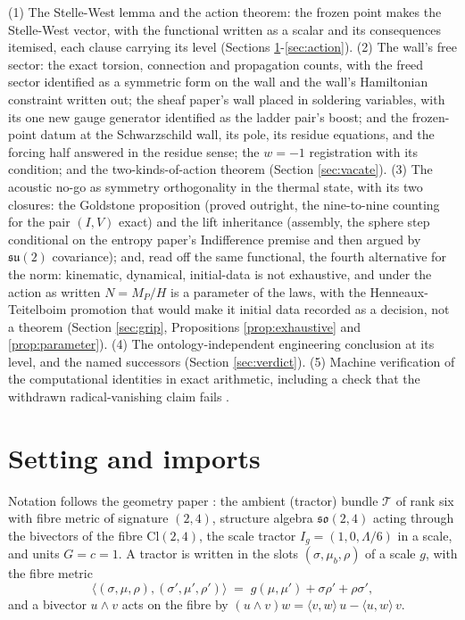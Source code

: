 \documentclass[11pt]{article}
\theoremstyle{definition}
\newcommand{\Cl}{\mathrm{Cl}}
\newcommand{\ip}[2]{\langle #1, #2\rangle}
\begin{document}
(1) The Stelle-West lemma and the action theorem: the frozen point makes the Stelle-West vector, with the functional written as a scalar and its consequences itemised, each clause carrying its level (Sections \ref{sec:setting}-\ref{sec:action}). (2) The wall's free sector: the exact torsion, connection and propagation counts, with the freed sector identified as a symmetric form on the wall and the wall's Hamiltonian constraint written out; the sheaf paper's wall placed in soldering variables, with its one new gauge generator identified as the ladder pair's boost; and the frozen-point datum at the Schwarzschild wall, its pole, its residue equations, and the forcing half answered in the residue sense; the $w = -1$ registration with its condition; and the two-kinds-of-action theorem (Section \ref{sec:vacate}). (3) The acoustic no-go as symmetry orthogonality in the thermal state, with its two closures: the Goldstone proposition (proved outright, the nine-to-nine counting for the pair $(I,V)$ exact) and the lift inheritance (assembly, the sphere step conditional on the entropy paper's Indifference premise and then argued by $\mathfrak{su}(2)$ covariance); and, read off the same functional, the fourth alternative for the norm: kinematic, dynamical, initial-data is not exhaustive, and under the action as written $N = M_P/H$ is a parameter of the laws, with the Henneaux-Teitelboim promotion that would make it initial data recorded as a decision, not a theorem (Section \ref{sec:grip}, Propositions \ref{prop:exhaustive} and \ref{prop:parameter}). (4) The ontology-independent engineering conclusion at its level, and the named successors (Section \ref{sec:verdict}). (5) Machine verification of the computational identities in exact arithmetic, including a check that the withdrawn radical-vanishing claim fails \cite{ButlerVerifyT10}.

\section{Setting and imports}\label{sec:setting}

Notation follows the geometry paper \cite{ButlerT6}: the ambient (tractor) bundle $\mathcal{T}$ of rank six with fibre metric of signature $(2,4)$, structure algebra $\mathfrak{so}(2,4)$ acting through the bivectors of the fibre $\Cl(2,4)$, the scale tractor $I_g = (1, 0, \Lambda/6)$ in a scale, and units $G = c = 1$. A tractor is written in the slots $(\sigma, \mu_b, \rho)$ of a scale $g$, with the fibre metric
\begin{equation}\label{eq:tractormetric}
\ip{(\sigma,\mu,\rho)}{(\sigma',\mu',\rho')} \;=\; g(\mu,\mu') + \sigma\rho' + \rho\sigma' ,
\end{equation}
and a bivector $u\wedge v$ acts on the fibre by $(u\wedge v)w = \ip{v}{w}\,u - \ip{u}{w}\,v$.
\end{document}

